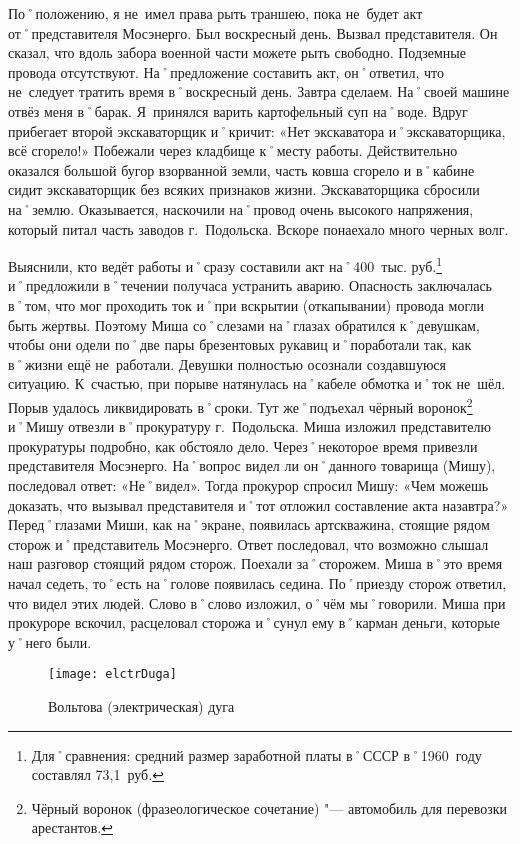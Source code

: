 По˚положению, я не~имел права рыть траншею, пока не~будет акт от˚представителя Мосэнерго. Был воскресный день. Вызвал представителя. Он сказал, что вдоль забора военной части можете рыть свободно. Подземные провода отсутствуют. На˚предложение составить акт, он˚ответил, что не~следует тратить время в˚воскресный день. Завтра сделаем. На˚своей машине отвёз меня в˚барак. Я~принялся варить картофельный суп на˚воде. Вдруг прибегает второй экскаваторщик и˚кричит: «Нет экскаватора и˚экскаваторщика, всё сгорело!» Побежали через кладбище к˚месту работы. Действительно оказался большой бугор взорванной земли, часть ковша сгорело и в˚кабине сидит экскаваторщик без всяких признаков жизни. Экскаваторщика сбросили на˚землю. Оказывается, наскочили на˚провод очень высокого напряжения, который питал часть заводов г.~Подольска. Вскоре понаехало много черных волг. 

Выяснили, кто ведёт работы и˚сразу составили акт на˚400~тыс. руб.\footnote{Для˚сравнения: средний размер заработной платы в˚СССР в˚1960~году составлял 73,1~руб.} и˚предложили в˚течении получаса устранить аварию. Опасность заключалась в˚том, что мог проходить ток и˚при вскрытии (откапывании) провода могли быть жертвы. Поэтому Миша со˚слезами на˚глазах обратился к˚девушкам, чтобы они одели по˚две пары брезентовых рукавиц и˚поработали так, как в˚жизни ещё не~работали. Девушки полностью осознали создавшуюся ситуацию. К~счастью, при порыве натянулась на˚кабеле обмотка и˚ток не~шёл. Порыв удалось ликвидировать в˚сроки. Тут же˚подъехал чёрный воронок\footnote{Чёрный воронок (фразеологическое сочетание) "--- автомобиль для перевозки арестантов.} и˚Мишу отвезли в˚прокуратуру г.~Подольска. Миша изложил представителю прокуратуры подробно, как обстояло дело. Через˚некоторое время привезли представителя Мосэнерго. На˚вопрос видел ли он˚данного товарища (Мишу), последовал ответ: «Не˚видел». Тогда прокурор спросил Мишу: «Чем можешь доказать, что вызывал представителя и˚тот отложил составление акта назавтра?»
Перед˚глазами Миши, как на˚экране, появилась артскважина, стоящие рядом сторож и˚представитель Мосэнерго. Ответ последовал, что возможно слышал наш разговор стоящий рядом сторож. Поехали за˚сторожем. Миша в˚это время начал седеть, то˚есть на˚голове появилась седина. По˚приезду сторож ответил, что видел этих людей. Слово в˚слово изложил, о˚чём мы˚говорили. Миша при прокуроре вскочил, расцеловал сторожа и˚сунул ему в˚карман деньги, которые у˚него были.

\begin{wrapfigure}{O}{.4\textwidth}
\centering
\texttt{[image: elctrDuga]}
\caption{Вольтова (электрическая) дуга}
\label{fig:elctrDuga}
\end{wrapfigure}

